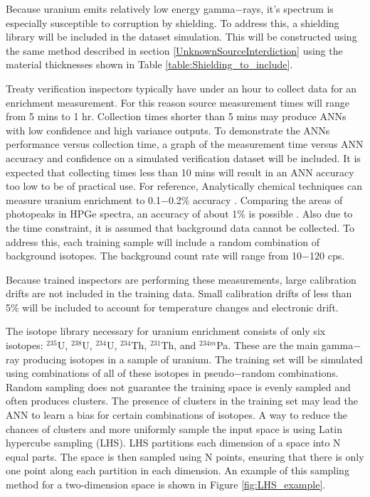 \documentclass[tocnosub,noragright,centerchapter,12pt,fullpage]{uiucecethesis09}
\begin{document}
Because uranium emits relatively low energy gamma$-$rays, it's spectrum is especially susceptible to corruption by shielding. To address this, a shielding library will be included in the dataset simulation. This will be constructed using the same method described in section \ref{UnknownSourceInterdiction} using the material thicknesses shown in Table \ref{table:Shielding_to_include}.

Treaty verification inspectors typically have under an hour to collect data for an enrichment measurement. For this reason source measurement times will range from 5 mins to 1 hr. Collection times shorter than 5 mins may produce ANNs with low confidence and high variance outputs. To demonstrate the ANNs performance versus collection time, a graph of the measurement time versus ANN accuracy and confidence on a simulated verification dataset will be included. It is expected that collecting times less than 10 mins will result in an ANN accuracy too low to be of practical use. For reference, Analytically chemical techniques can measure uranium enrichment to 0.1$-$0.2\% accuracy \cite{Pandas_Ch7_1991}. Comparing the areas of photopeaks in HPGe spectra, an accuracy of about 1\% is possible \cite{Pandas_Ch7_1991}. Also due to the time constraint, it is assumed that background data cannot be collected. To address this, each training sample will include a random combination of background isotopes. The background count rate will range from 10$-$120 cps.


Because trained inspectors are performing these measurements, large calibration drifts are not included in the training data. Small calibration drifts of less than 5\% will be included to account for temperature changes and electronic drift.

The isotope library necessary for uranium enrichment consists of only six isotopes: $^{235}$U, $^{238}$U, $^{234}$U, $^{234}$Th, $^{231}$Th, and $^{234m}$Pa. These are the main gamma$-$ray producing isotopes in a sample of uranium. The training set will be simulated using combinations of all of these isotopes in pseudo$-$random combinations. Random sampling does not guarantee the training space is evenly sampled and often produces clusters. The presence of clusters in the training set may lead the ANN to learn a bias for certain combinations of isotopes. A way to reduce the chances of clusters and more uniformly sample the input space is using Latin hypercube sampling (LHS). LHS partitions each dimension of a space into N equal parts. The space is then sampled using N points, ensuring that there is only one point along each partition in each dimension. An example of this sampling method for a two-dimension space is shown in Figure \ref{fig:LHS_example}.
\end{document}
